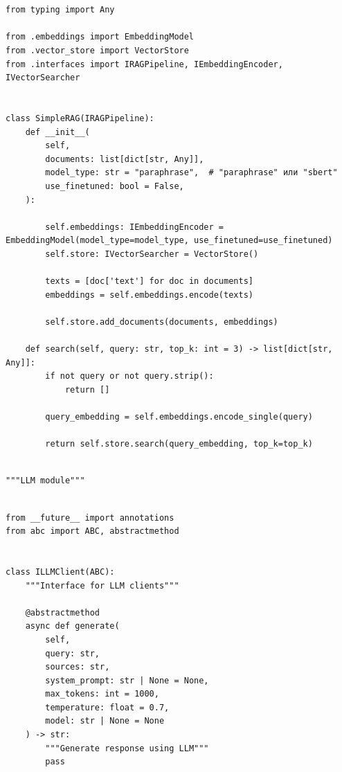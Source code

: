 \begin{lstlisting}[basicstyle=\tiny\ttfamily,breaklines=true]


from typing import Any

from .embeddings import EmbeddingModel
from .vector_store import VectorStore
from .interfaces import IRAGPipeline, IEmbeddingEncoder, IVectorSearcher


class SimpleRAG(IRAGPipeline):
    def __init__(
        self,
        documents: list[dict[str, Any]],
        model_type: str = "paraphrase",  # "paraphrase" или "sbert"
        use_finetuned: bool = False,
    ):

        self.embeddings: IEmbeddingEncoder = EmbeddingModel(model_type=model_type, use_finetuned=use_finetuned)
        self.store: IVectorSearcher = VectorStore()

        texts = [doc['text'] for doc in documents]
        embeddings = self.embeddings.encode(texts)

        self.store.add_documents(documents, embeddings)

    def search(self, query: str, top_k: int = 3) -> list[dict[str, Any]]:
        if not query or not query.strip():
            return []

        query_embedding = self.embeddings.encode_single(query)

        return self.store.search(query_embedding, top_k=top_k)
\end{lstlisting}

\begin{lstlisting}[basicstyle=\tiny\ttfamily,breaklines=true]

"""LLM module"""
\end{lstlisting}

\begin{lstlisting}[basicstyle=\tiny\ttfamily,breaklines=true]

from __future__ import annotations
from abc import ABC, abstractmethod


class ILLMClient(ABC):
    """Interface for LLM clients"""

    @abstractmethod
    async def generate(
        self,
        query: str,
        sources: str,
        system_prompt: str | None = None,
        max_tokens: int = 1000,
        temperature: float = 0.7,
        model: str | None = None
    ) -> str:
        """Generate response using LLM"""
        pass
\end{lstlisting}

